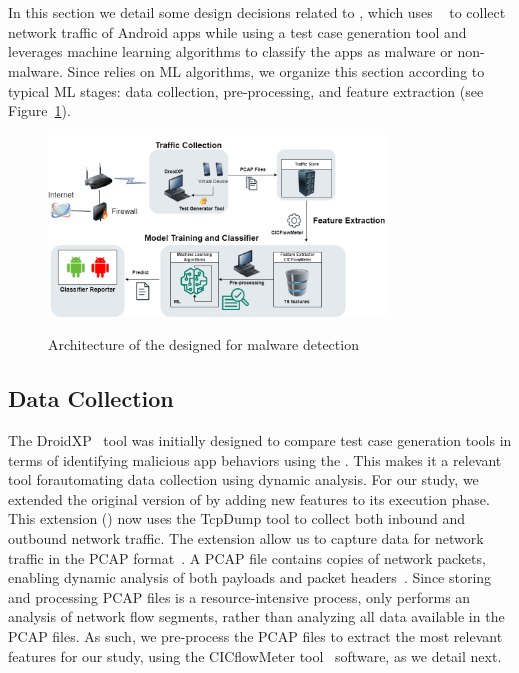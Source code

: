 \section{\droidxpflow}

In this section we detail some design decisions
related to \droidxpflow, which uses \droidxp~\cite{DBLP:conf/scam/CostaMCMVBC20} to
collect network traffic of Android apps while
using a test case generation tool and leverages
machine learning algorithms to classify the
apps as malware or non-malware. Since \droidxpflow
relies on ML algorithms, we organize this section
according to typical ML stages: data collection,
pre-processing, and 
feature extraction (see Figure~\ref{fig:arq}).


\begin{figure}[h]
  \centering
  
    \includegraphics[width=0.80\textwidth]{image/archic.png} \\[\abovecaptionskip]
    
  \caption{Architecture of the \droidxpflow designed for malware detection}\label{fig:arq}
\end{figure}

\subsection{Data Collection}

The DroidXP~\cite{DBLP:conf/scam/CostaMCMVBC20} tool was initially designed to compare test case generation tools in terms of identifying malicious app behaviors using the \mas. This makes it a relevant tool forautomating data collection using dynamic analysis.%
For our study, we extended the original version of \droidxp by adding new features to its execution phase. This extension (\droidxpflow) now uses the TcpDump tool
to collect both inbound and outbound network traffic. The \droidxpflow extension allow us to capture data for network traffic in the PCAP format~\cite{DBLP:conf/iv/UhlarHR21}.
A PCAP file contains copies of network packets, enabling dynamic analysis of both payloads and packet headers~\cite{DBLP:conf/iv/UhlarHR21}. Since storing
and processing PCAP files is a resource-intensive process, \droidxpflow only performs an analysis of network flow segments, rather than analyzing all data available in the PCAP
files. As such, we pre-process the PCAP files to extract the most relevant features for our study, using the CICflowMeter tool~\cite{DBLP:conf/icissp/LashkariDMG17} software,
as we detail next.



